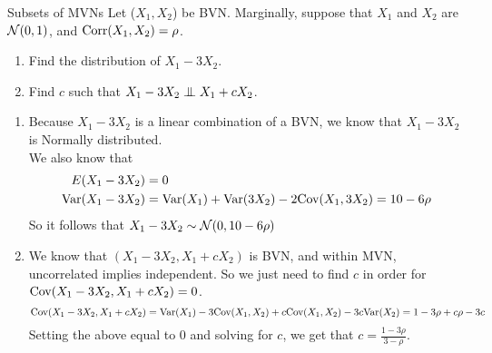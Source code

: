 \documentclass[11.5pt]{article}
\begin{document}

\begin{exercise}{Subsets of MVNs}
Let ($X_1, X_2$) be BVN. Marginally, suppose that $X_1$ and $X_2$ are $\mathcal{N}(0,1)$, and $\textrm{Corr}(X_1, X_2) = \rho$. 
\begin{enumerate}
	\item Find the distribution of $X_1 - 3X_2$.
	\item Find $c$ such that $X_1-3X_2 \independent X_1 + cX_2$.
\end{enumerate}
\end{exercise}
\begin{solution}{4.5}
\begin{enumerate}
    \vspace{-5mm}
    \item Because $X_1 - 3 X_2$ is a linear combination of a BVN, we know that $X_1 - 3 X_2$ is Normally distributed. \\
    We also know that
    \begin{align*}
        E(X_1 - 3 X_2) & = 0 \\
        \textrm{Var}(X_1 - 3 X_2) &= \textrm{Var}(X_1) + \textrm{Var}(3 X_2) - 2 \textrm{Cov}(X_1, 3 X_2) = 10 - 6 \rho
    \end{align*}
    So it follows that $X_1 - 3 X_2 \sim \mathcal{N}(0, 10 - 6 \rho)$
    
    \item We know that $(X_1 - 3 X_2, X_1 + c X_2)$ is BVN, and within MVN, uncorrelated implies independent. So we just need to find $c$ in order for $\textrm{Cov}(X_1 - 3 X_2, X_1 + c X_2) = 0$.
    $$\textrm{Cov}(X_1 - 3 X_2, X_1 + c X_2) = \textrm{Var}(X_1) - 3 \textrm{Cov}(X_1, X_2) + c \textrm{Cov}(X_1, X_2) - 3c \textrm{Var}(X_2) = 1 - 3\rho + c \rho - 3c$$
    Setting the above equal to 0 and solving for $c$, we get that $c = \frac{1 - 3 \rho}{3 - \rho}$.
\end{enumerate}
\end{solution}


\end{document}

